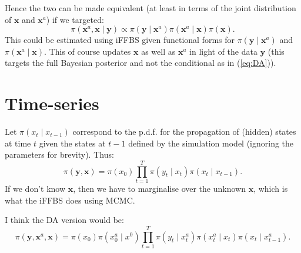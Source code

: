 \documentclass[a4paper]{article}
\newcommand{\bx}{\bm{x}}
\newcommand{\by}{\bm{y}}
\begin{document}
Hence the two can be made equivalent (at least in terms of the joint distribution of $\bx$ and $\bx^a$) if we targeted:
\begin{equation}
    \pi\left(\bx^a, \bx \mid \by\right) \propto \pi\left(\by \mid \bx^a\right)\pi\left(\bx^a \mid \bx\right)\pi\left(\bx\right). \label{eq:joint}
\end{equation}
This could be estimated using iFFBS given functional forms for $\pi\left(\by \mid \bx^a\right)$ and $\pi\left(\bx^a \mid \bx\right)$. This of course updates $\bx$ as well as $\bx^a$ in light of the data $\by$ (this targets the full Bayesian posterior and not the conditional as in (\ref{eq:DA})).

\section{Time-series}
Let $\pi\left(x_t \mid x_{t-1}\right)$ correspond to the p.d.f. for the propagation of (hidden) states at time $t$ given the states at $t-1$ defined by the simulation model (ignoring the parameters for brevity). Thus:
\begin{equation}
    \pi\left(\by, \bx\right) = \pi\left(x_0\right)\prod_{t=1}^T \pi\left(y_t \mid x_t\right)\pi\left(x_t \mid x_{t - 1}\right).
\end{equation}
If we don't know $\bx$, then we have to marginalise over the unknown $\bx$, which is what the iFFBS does using MCMC.

I think the DA version would be:
\begin{equation}
    \pi\left(\by, \bx^a, \bx\right) = \pi\left(x_0\right)\pi\left(x_0^a \mid x^0\right)\prod_{t=1}^T \pi\left(y_t \mid x_t^a\right)\pi\left(x_t^a \mid x_t\right)\pi\left(x_t \mid x^a_{t - 1}\right).
\end{equation}


\end{document}
